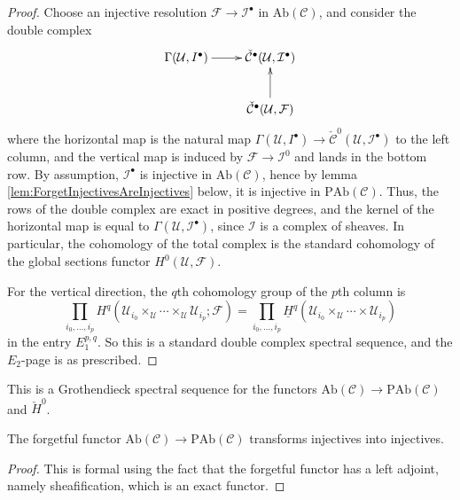 \begin{proof}
    Choose an injective resolution $\mathcal{F}\to \mathcal{I}^\bullet$ in 
$\text{Ab}(\mathcal{C})$, and consider the double complex
$$
\xymatrix{
{\Gamma(\mathcal{U},  I^\bullet)}  \ar[r] & 
{\check{\mathcal{C}}^\bullet(\mathcal{U}, \mathcal{I}^\bullet)} \\ 
& {\check{\mathcal{C}}^\bullet(\mathcal{U}, \mathcal{F})} \ar[u]
}
$$
where the horizontal map is the natural map $\Gamma(\mathcal{U},  I^\bullet) 
\to \check{\mathcal{C}}^0(\mathcal{U}, \mathcal{I}^\bullet)$ to the left 
column, and the vertical map is induced by  $\mathcal{F}\to \mathcal{I}^0$ and 
lands in the bottom row. By assumption, $\mathcal{I}^\bullet$ is injective in 
$\text{Ab}(\mathcal{C})$, hence by lemma 
\ref{lem:ForgetInjectivesAreInjectives} below, it is injective in 
$\text{PAb}(\mathcal{C})$. Thus, the rows of the double complex are exact in 
positive degrees, and the kernel of the horizontal map is equal to 
$\Gamma(\mathcal{U}, \mathcal{I}^\bullet)$, since $\mathcal{I}$ is a complex of 
sheaves. In particular, the cohomology of the total complex is the standard 
cohomology of the global sections functor $H^0(\mathcal{U}, \mathcal{F})$. 

\medskip\noindent
For the vertical direction, the $q$th cohomology group of the $p$th column is 
$$ 
\prod_{i_0,\ldots, i_p}  H^q(\mathcal{U}_{i_0}\times_\mathcal{U} \cdots 
\times_\mathcal{U} \mathcal{U}_{i_p} ; \mathcal{F}) =\prod_{i_0, \dots, 
i_p}\underline{H}^q(\mathcal{U}_{i_0}\times_\mathcal{U} \cdots \times 
\mathcal{U}_{i_p})
$$
in the entry $E_1^{p,q}$. So this is a standard double complex spectral 
sequence, and the $E_2$-page is as prescribed.
\end{proof}
  
\begin{remark}
This is a Grothendieck spectral sequence for the functors 
$\text{Ab}(\mathcal{C}) \to \text{PAb}(\mathcal{C})$ and $\check H^0$.
\end{remark}
  
\begin{lemma} \label{lem:ForgetInjectivesAreInjectives}
The forgetful functor $\text{Ab}(\mathcal{C})\to \text{PAb}(\mathcal{C})$ 
transforms injectives into injectives.  
\end{lemma}
  
\begin{proof}
This is formal using the fact that the forgetful functor has a left adjoint, 
namely sheafification, which is an exact functor. 
\end{proof}

